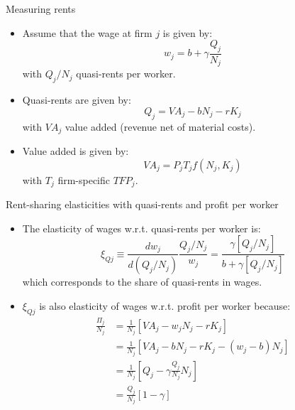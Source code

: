 \documentclass[notes=show]{beamer}
\begin{document}
\begin{frame}{Measuring rents}
\begin{itemize}
\item Assume that the wage at firm $j$ is given by:
\begin{equation*}
    w_{j} = b + \gamma \frac{Q_{j}}{N_{j}} \tag{1}
\end{equation*}
with $Q_{j}/N_{j}$ quasi-rents per worker. 
\medskip
\item Quasi-rents are given by:
\begin{equation*}
    Q_{j} = VA_{j} - bN_{j} - rK_{j}
\end{equation*}
with $VA_{j}$ value added (revenue net of material costs). \medskip
\item Value added is given by:
\begin{equation*}
    VA_{j} = P_{j} T_{j} f(N_{j},K_{j})
\end{equation*}
with $T_{j}$ firm-specific $TFP_{j}$.
\end{itemize}
\end{frame}

\begin{frame}{Rent-sharing elasticities with quasi-rents and profit per worker}
\begin{itemize}
\item The elasticity of wages w.r.t. quasi-rents per worker is:
\begin{equation*}
    \xi_{Q{j}} \equiv \frac{d w_{j}}{d (Q_{j}/N_{j})} \frac{Q_{j}/N_{j}}{w_{j}} = \frac{\gamma [Q_{j}/N_{j}]}{b + \gamma [Q_{j}/N_{j}]} \tag{2}
\end{equation*}
which corresponds to the share of quasi-rents in wages. \medskip
\item $\xi_{Q{j}} $ is also elasticity of wages w.r.t. profit per worker because:
\begin{align*}
    \frac{\Pi_{j}}{N_{j}} & = \frac{1}{N_{j}} \left[ VA_{j} - w_{j}N_{j} - rK_{j} \right] \nonumber \\
    & = \frac{1}{N_{j}} \left[ VA_{j} - bN_{j} - rK_{j} - (w_{j} - b)N_{j} \right] \nonumber \\
    & = \frac{1}{N_{j}} \left[ Q_{j} - \gamma \frac{Q_{j}}{N_{j}}N_{j} \right] \nonumber \\
    & = \frac{Q_{j}}{N_{j}} \left[ 1 - \gamma \right] \nonumber
\end{align*}
\end{itemize}
\end{frame}
\end{document}
